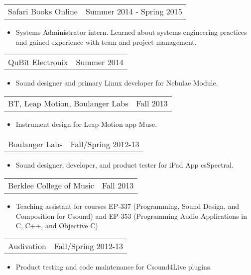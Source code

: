 \documentclass[margin]{res}
\begin{document}
\begin{resume}
\begin{tabular}{p{3in} r} %
Safari Books Online &  Summer 2014 - Spring 2015
\end{tabular}	
\begin{itemize} %
\item[] Systems Administrator intern. Learned about systems engineering 
practices and gained experience with team and project management. 
\end{itemize} 

\begin{tabular}{p{3in} r} %
QuBit Electronix&  Summer 2014
\end{tabular}	
\begin{itemize} %
\item[] Sound designer and primary Linux developer for Nebulae Module. 
\end{itemize} 

\begin{tabular}{p{3in} r} %
BT, Leap Motion, Boulanger Labs&  Fall 2013
\end{tabular}	
\begin{itemize} %
\item[] Instrument design for Leap Motion app Muse.
\end{itemize} 

\begin{tabular}{p{3in} r} %
Boulanger Labs&  Fall/Spring 2012-13
\end{tabular}	
\begin{itemize} %
\item[] Sound designer, developer, and product tester for iPad App csSpectral.
\end{itemize} 

\begin{tabular}{p{3in} r} %
Berklee College of Music&  Fall 2013
\end{tabular}	
\begin{itemize} %
\item[] Teaching assistant for courses EP-337 (Programming, Sound Design, and
Composition for Csound) and EP-353 (Programming Audio Applications in C, C++, and 
Objective C)
\end{itemize} 

\begin{tabular}{p{3in} r} %
Audivation&   Fall/Spring 2012-13
\end{tabular}	
\begin{itemize} %
\item[] Product testing and code maintenance for Csound4Live plugins. 
\end{itemize} 

\end{resume} 
\end{document}
